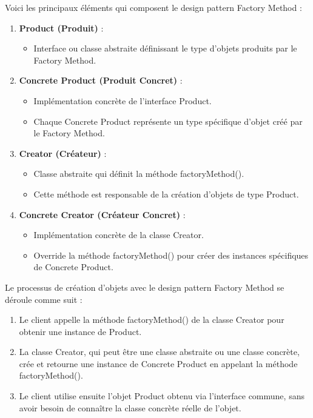 Voici les principaux éléments qui composent le design pattern Factory Method :

\begin{enumerate}[leftmargin=*,labelsep=3mm]
    \item \textbf{Product (Produit)} :
    \begin{itemize}
        \item Interface ou classe abstraite définissant le type d'objets produits par le Factory Method.
    \end{itemize}
    
    \item \textbf{Concrete Product (Produit Concret)} :
    \begin{itemize}
        \item Implémentation concrète de l'interface Product.
        \item Chaque Concrete Product représente un type spécifique d'objet créé par le Factory Method.
    \end{itemize}
    
    \item \textbf{Creator (Créateur)} :
    \begin{itemize}
        \item Classe abstraite qui définit la méthode factoryMethod().
        \item Cette méthode est responsable de la création d'objets de type Product.
    \end{itemize}
    
    \item \textbf{Concrete Creator (Créateur Concret)} :
    \begin{itemize}
        \item Implémentation concrète de la classe Creator.
        \item Override la méthode factoryMethod() pour créer des instances spécifiques de Concrete Product.
    \end{itemize}
\end{enumerate}

Le processus de création d'objets avec le design pattern Factory Method se déroule comme suit :

\begin{enumerate}[leftmargin=*,labelsep=3mm]
    \item Le client appelle la méthode factoryMethod() de la classe Creator pour obtenir une instance de Product.
    \item La classe Creator, qui peut être une classe abstraite ou une classe concrète, crée et retourne une instance de Concrete Product en appelant la méthode factoryMethod().
    \item Le client utilise ensuite l'objet Product obtenu via l'interface commune, sans avoir besoin de connaître la classe concrète réelle de l'objet.
\end{enumerate}

